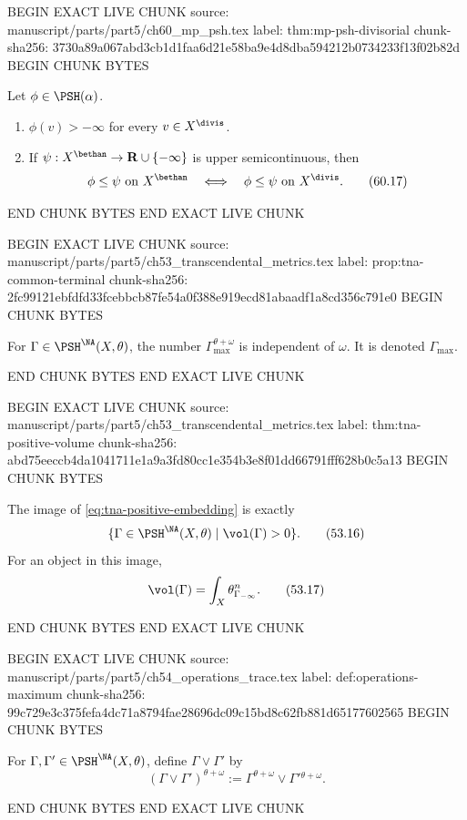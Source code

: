 BEGIN EXACT LIVE CHUNK
source: manuscript/parts/part5/ch60_mp_psh.tex
label: thm:mp-psh-divisorial
chunk-sha256: 3730a89a067abd3cb1d1faa6d21e58ba9e4d8dba594212b0734233f13f02b82d
BEGIN CHUNK BYTES
\begin{theorem}\label{thm:mp-psh-divisorial}
Let \(\phi\in\PSH(\alpha)\).
\begin{enumerate}
\item \(\phi(v)>-\infty\) for every \(v\in X^{\divis}\).
\item If \(\psi:X^{\bethan}\to\mathbf R\cup\{-\infty\}\) is upper
      semicontinuous, then
      \[
        \phi\leq\psi\text{ on }X^{\bethan}
        \quad\Longleftrightarrow\quad
        \phi\leq\psi\text{ on }X^{\divis}.
      \tag{60.17}\label{eq:mp-divisorial-comparison}
      \]
\end{enumerate}
\par
\end{theorem}
END CHUNK BYTES
END EXACT LIVE CHUNK

BEGIN EXACT LIVE CHUNK
source: manuscript/parts/part5/ch53_transcendental_metrics.tex
label: prop:tna-common-terminal
chunk-sha256: 2fc99121ebfdfd33fcebbcb87fe54a0f388e919ecd81abaadf1a8cd356c791e0
BEGIN CHUNK BYTES
\begin{proposition}\label{prop:tna-common-terminal}
For \(\Gamma\in\PSH^{\NA}(X,\theta)\), the number
\(\Gamma^{\theta+\omega}_{\max}\) is independent of \(\omega\).
It is denoted \(\Gamma_{\max}\).
\end{proposition}
END CHUNK BYTES
END EXACT LIVE CHUNK

BEGIN EXACT LIVE CHUNK
source: manuscript/parts/part5/ch53_transcendental_metrics.tex
label: thm:tna-positive-volume
chunk-sha256: abd75eeccb4da1041711e1a9a3fd80cc1e354b3e8f01dd66791fff628b0c5a13
BEGIN CHUNK BYTES
\begin{theorem}\label{thm:tna-positive-volume}
The image of \eqref{eq:tna-positive-embedding} is exactly
\[
       \{\Gamma\in\PSH^{\NA}(X,\theta)\mid\vol(\Gamma)>0\}.
\tag{53.16}\label{eq:tna-positive-volume-locus}
\]
For an object in this image,
\[
                 \vol(\Gamma)
                 =\int_X\theta_{\Gamma_{-\infty}}^n.
\tag{53.17}\label{eq:tna-positive-volume-formula}
\]
\end{theorem}
END CHUNK BYTES
END EXACT LIVE CHUNK

BEGIN EXACT LIVE CHUNK
source: manuscript/parts/part5/ch54_operations_trace.tex
label: def:operations-maximum
chunk-sha256: 99c729e3c375fefa4dc71a8794fae28696dc09c15bd8c62fb881d65177602565
BEGIN CHUNK BYTES
\begin{definition}[Maximum]
\label{def:operations-maximum}
For \(\Gamma,\Gamma'\in\PSH^{\NA}(X,\theta)\), define
\(\Gamma\vee\Gamma'\) by
\[
 (\Gamma\vee\Gamma')^{\theta+\omega}
 :=\Gamma^{\theta+\omega}\vee
       \Gamma'{}^{\theta+\omega}.
\tag{54.5}\label{eq:operations-maximum}
\]
\end{definition}
END CHUNK BYTES
END EXACT LIVE CHUNK

